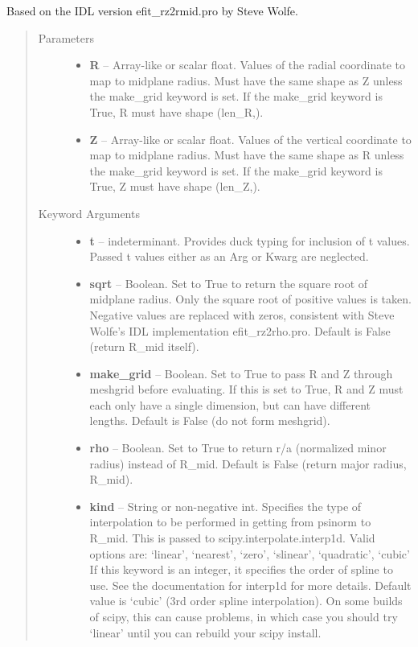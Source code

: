 \documentclass[letterpaper,10pt,english]{sphinxmanual}
\begin{document}
\begin{fulllineitems}
\begin{fulllineitems}
Based on the IDL version efit\_rz2rmid.pro by Steve Wolfe.
\begin{quote}\begin{description}
\item[{Parameters }] \leavevmode\begin{itemize}
\item {} 
\textbf{R} --
Array-like or scalar float.
Values of the radial coordinate to
map to midplane radius. Must have the same shape as Z unless
the make\_grid keyword is set. If the make\_grid keyword is True,
R must have shape (len\_R,).

\item {} 
\textbf{Z} --
Array-like or scalar float.
Values of the vertical coordinate to
map to midplane radius. Must have the same shape as R unless the
make\_grid keyword is set. If the make\_grid keyword is True, Z
must have shape (len\_Z,).

\end{itemize}

\item[{Keyword Arguments}] \leavevmode\begin{itemize}
\item {} 
\textbf{t} --
indeterminant.
Provides duck typing for inclusion of t values. Passed t values
either as an Arg or Kwarg are neglected.

\item {} 
\textbf{sqrt} --
Boolean.
Set to True to return the square root of midplane
radius. Only the square root of positive values is taken.
Negative values are replaced with zeros, consistent with Steve
Wolfe's IDL implementation efit\_rz2rho.pro. Default is False
(return R\_mid itself).

\item {} 
\textbf{make\_grid} --
Boolean.
Set to True to pass R and Z through meshgrid
before evaluating. If this is set to True, R and Z must each
only have a single dimension, but can have different lengths.
Default is False (do not form meshgrid).

\item {} 
\textbf{rho} --
Boolean.
Set to True to return r/a (normalized minor radius)
instead of R\_mid. Default is False (return major radius, R\_mid).

\item {} 
\textbf{kind} --
String or non-negative int.
Specifies the type of interpolation
to be performed in getting from psinorm to R\_mid. This is
passed to scipy.interpolate.interp1d. Valid options are:
`linear', `nearest', `zero', `slinear', `quadratic', `cubic'
If this keyword is an integer, it specifies the order of spline
to use. See the documentation for interp1d for more details.
Default value is `cubic' (3rd order spline interpolation). On
some builds of scipy, this can cause problems, in which case
you should try `linear' until you can rebuild your scipy install.


\end{itemize}
\end{description}
\end{quote}
\end{fulllineitems}
\end{fulllineitems}
\end{document}
